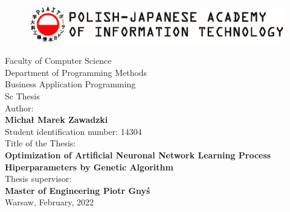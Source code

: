 \documentclass[a4paper,11pt]{article}
\begin{document}
    \newpage

    \thispagestyle{empty}

    \begin{figure}[H]
        \label{fig:pjatk_logo_en}
        \centering
        \includegraphics[width=\textwidth]{pjatk_logo_en}
    \end{figure}

    \begin{center}

        \vspace{1.3cm}
        \large
        Faculty of Computer Science \\

        \vspace{0.4cm}
        \large
        Department of Programming Methods \\

        \vspace{0.4cm}
        \large
        Business Application Programming  \\

        \vspace{1cm}
        \LARGE
        Sc Thesis \\

        \vspace{1.3cm}
        \normalsize
        Author: \\
        \vspace{.3cm}
        \large
        \textbf{Michał Marek Zawadzki} \\
        Student identification number: 14304 \\

        \vspace{1.3cm}
        \normalsize
        Title of the Thesis: \\
        \vspace{.3cm}
        \LARGE
        \textbf{Optimization of Artificial Neuronal Network Learning Process Hiperparameters by Genetic Algorithm} \\

        \vspace{1.3cm}
        \normalsize
        Thesis supervisor: \\
        \vspace{.3cm}
        \large
        \textbf{Master of Engineering Piotr Gnyś} \\

        \vspace{2.3cm}
        \normalsize
        Warsaw, February, 2022 \\

    \end{center}
\end{document}
